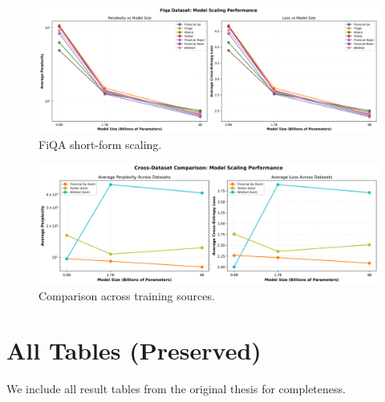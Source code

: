 \begin{figure}[H]
  \centering
  \includegraphics[width=\textwidth]{../thesis/figures/scaling_fiqa.png}
  \caption{FiQA short-form scaling.}\label{fig:scaling_fiqa}
\end{figure}

\begin{figure}[H]
  \centering
  \includegraphics[width=\textwidth]{../thesis/figures/scaling_comparison_all.png}
  \caption{Comparison across training sources.}\label{fig:scaling_comparison_all}
\end{figure}

\section{All Tables (Preserved)}
We include all result tables from the original thesis for completeness.
























